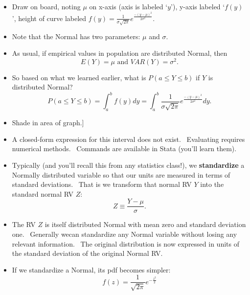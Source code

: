 \documentclass[11pt]{article}
\begin{document}
\begin{itemize}
\item Draw on board, noting $\mu $ on x-axis (axis is labeled `$y$'), y-axis
labeled `$f(y)$', height of curve labeled $f(y)=\frac{1}{\sigma \sqrt{2\pi }}%
e^{\frac{-(y-\mu )^{2}}{2\sigma ^{2}}}.$

\item Note that the Normal has two parameters: $\mu $ and $\sigma .$

\item As usual, if empirical values in population are distributed Normal,
then%
\begin{equation*}
E(Y)=\mu \text{ and }VAR(Y)=\sigma ^{2}.
\end{equation*}

\item So based on what we learned earlier, what is $P(a\leq Y\leq b)$ if $Y$
is distributed Normal?%
\begin{equation*}
P(a\leq Y\leq b)=\int_{a}^{b}f(y)dy=\int_{a}^{b}\frac{1}{\sigma \sqrt{2\pi }}%
e^{\frac{-(y-\mu )^{2}}{2\sigma ^{2}}}dy.
\end{equation*}

\item \lbrack Shade in area of graph.]

\item A closed-form expression for this interval does not exist. \
Evaluating requires numerical methods. \ Commands are available in Stata
(you'll learn them).

\item Typically (and you'll recall this from any statistics class!), we 
\textbf{standardize }a Normally distributed variable so that our units are
measured in terms of standard deviations. \ That is we transform that normal
RV $Y$ into the standard normal RV $Z:$%
\begin{equation*}
Z\equiv \frac{Y-\mu }{\sigma }.
\end{equation*}

\item The RV $Z$ is itself distributed Normal with mean zero and standard
deviation one. \ Generally wecan standardize any Normal variable without
losing any relevant information. \ The original distribution is now
expressed in units of the standard deviation of the original Normal RV.

\item If we standardize a Normal, its pdf becomes simpler:%
\begin{equation*}
f\left( z\right) =\frac{1}{\sqrt{2\pi }}e^{-\frac{z^{2}}{2}}
\end{equation*}


\end{itemize}
\end{document}
